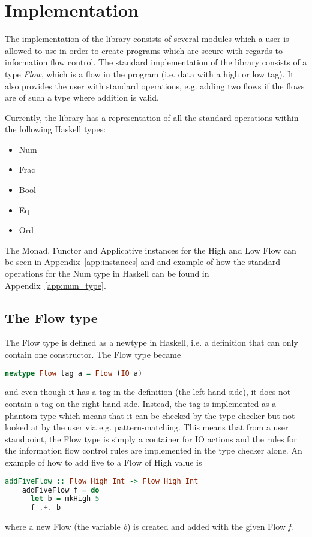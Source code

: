 \chapter{Implementation}
\label{chapter:implementation}
The implementation of the library consists of several modules which a user is allowed to use in order to create programs which are secure with regards to information flow control. The standard implementation of the library consists of a type \emph{Flow}, which is a flow in the program (i.e. data with a high or low tag). It also provides the user with standard operations, e.g. adding two flows if the flows are of such a type where addition is valid.

Currently, the library has a representation of all the standard operations within the following Haskell types:
\begin{itemize}
  \item Num
  \item Frac
  \item Bool
  \item Eq
  \item Ord
\end{itemize}

The Monad, Functor and Applicative instances for the High and Low Flow can be seen in Appendix~\ref{app:instances} and and example of how the standard operations for the Num type in Haskell can be found in Appendix~\ref{app:num_type}.
\section{The Flow type}
\label{sec:flow}
The Flow type is defined as a newtype in Haskell, i.e. a definition that can only contain one constructor. The Flow type became
\begin{center}
  \begin{lstlisting}[language=Haskell]
    newtype Flow tag a = Flow (IO a)
  \end{lstlisting}
\end{center}
and even though it has a tag in the definition (the left hand side), it does not contain a tag on the right hand side. Instead, the tag is implemented as a phantom type\cite{haskell_phantom} which means that it can be checked by the type checker but not looked at by the user via e.g. pattern-matching. This means that from a user standpoint, the Flow type is simply a container for IO actions and the rules for the information flow control rules are implemented in the type checker alone. An example of how to add five to a Flow of High value is
\begin{center}
  \begin{lstlisting}[language=Haskell]
    addFiveFlow :: Flow High Int -> Flow High Int
    addFiveFlow f = do
      let b = mkHigh 5
      f .+. b
  \end{lstlisting}
\end{center}
where a new Flow (the variable \emph{b}) is created and added with the given Flow \emph{f}.

